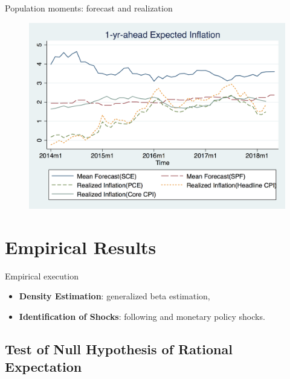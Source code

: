 \documentclass{beamer}
\begin{document}
\begin{frame}{Population moments: forecast and realization}
\begin{figure}
	\includegraphics[scale=0.3]{figures/mean_true.png} 
\end{figure}
\end{frame}

\section{Empirical Results}


\begin{frame}{Empirical execution}

\begin{itemize}

\item \textbf{Density Estimation}: generalized beta estimation, \cite{engelberg2009comparing}
 \item \textbf{Identification of Shocks}: following \cite{coibion2012can} and monetary policy shocks. 
\end{itemize}

\end{frame}

\subsection{Test of Null Hypothesis of Rational Expectation}
\end{document}
